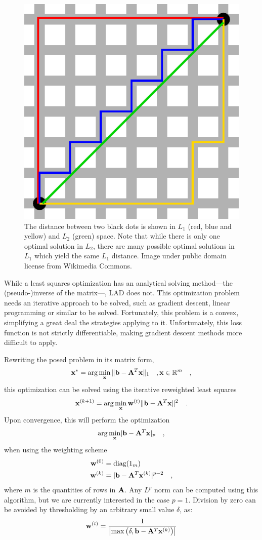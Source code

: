 \documentclass{report}
\begin{document}
\begin{figure}
  \centering
  \includegraphics[width=0.45\linewidth]{q5b_manhattan_distance.pdf}
  \caption[ Examples of $L_1$ and $L_2$ distances ]
   {The distance between two black dots is shown in $L_1$ (red, blue and yellow) and $L_2$ (green) space. Note that while there is only one optimal solution in $L_2$, there are many possible optimal solutions in $L_1$ which yield the same $L_1$ distance. Image under public domain license from Wikimedia Commons.}
   \label{q5b:paths}
\end{figure}

While a least squares optimization has an analytical solving method---the (pseudo-)inverse of the matrix---, LAD does not. This optimization problem needs an iterative approach to be solved, such as gradient descent, linear programming or similar to be solved. Fortunately, this problem is a convex, simplifying a great deal the strategies applying to it. Unfortunately, this loss function is not strictly differentiable, making gradient descent methods more difficult to apply.

Rewriting the posed problem in its matrix form,
\begin{equation}
\mathbf{x}^* = \arg \min_{\mathbf{x}} \| \mathbf{b} - \mathbf{A}^T\mathbf{x} \|_1 \quad, \mathbf{x} \in \mathbb{R}^m
\quad,
\end{equation}
this optimization can be solved using the iterative reweighted least squares
\begin{equation}
\mathbf{x}^{(k+1)} = \arg \min_{\mathbf{x}} \mathbf{w}^{(t)} \| \mathbf{b} - \mathbf{A}^T\mathbf{x} \|^2
\quad.
\end{equation}
Upon convergence, this will perform the optimization
\begin{equation}
\arg \min_{\mathbf{x}} \lvert \mathbf{b} - \mathbf{A}^T\mathbf{x} \rvert_p
\quad,
\end{equation}
when using the weighting scheme
\begin{align}
\mathbf{w}^{(0)} &= \text{diag}(1_m) \\
\mathbf{w}^{(k)} &= \lvert \mathbf{b} - \mathbf{A}^T\mathbf{x}^{(k)} \rvert^{p-2}
\quad,
\end{align}
where $m$ is the quantities of rows in $\mathbf{A}$. Any $L^p$ norm can be computed using this algorithm, but we are currently interested in the case $p = 1$. Division by zero can be avoided by thresholding by an arbitrary small value $\delta$, as:
\begin{equation}
\mathbf{w}^{(t)} = \frac{1}{ \left\lvert \max\left(\delta, \mathbf{b} - \mathbf{A}^T\mathbf{x}^{(k)}\right) \right\rvert}
\end{equation}
\end{document}

